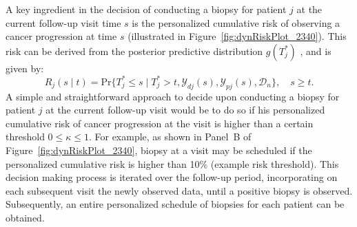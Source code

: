 A key ingredient in the decision of conducting a biopsy for patient $j$ at the current follow-up visit time $s$ is the personalized cumulative risk of observing a cancer progression at time $s$ (illustrated in Figure~\ref{fig:dynRiskPlot_2340}). This risk can be derived from the posterior predictive distribution $g(T^*_j)$ \cite{rizopoulos2011dynamic}, and is given by:
\begin{equation}
\label{eq:dynamic_risk_prob}
R_j(s \mid t) = \mbox{Pr}\big\{T^*_j \leq s \mid T^*_j > t, \mathcal{Y}_{dj}(s), \mathcal{Y}_{pj}(s), \mathcal{D}_n\big\}, \quad s \geq t.
\end{equation}
A simple and straightforward approach to decide upon conducting a biopsy for patient $j$ at the current follow-up visit would be to do so if his personalized cumulative risk of cancer progression at the visit is higher than a certain threshold $0 \leq \kappa \leq 1$. For example, as shown in Panel~B of Figure~\ref{fig:dynRiskPlot_2340}, biopsy at a visit may be scheduled if the personalized cumulative risk is higher than 10\% (example risk threshold). This decision making process is iterated over the follow-up period, incorporating on each subsequent visit the newly observed data, until a positive biopsy is observed. Subsequently, an entire personalized schedule of biopsies for each patient can be obtained.


